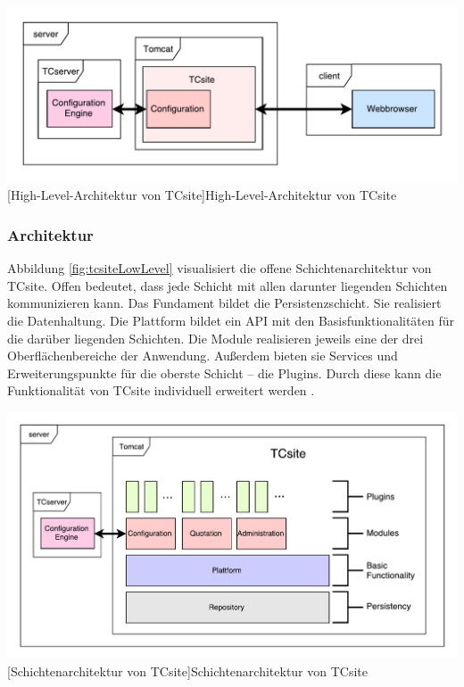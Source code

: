 \documentclass[11pt, a4paper, titlepage, listof=totoc, bibliography=totoc, index=totoc, twoside, openright, headings=normal, draft]{scrreprt}
\begin{document}
\vspace{1em}
\begin{minipage}{\linewidth}
	\centering
	\includegraphics[width=1\linewidth]{Abbildungen/tcsiteHighLevel.pdf}
	[High-Level-Architektur von TCsite]{High-Level-Architektur von TCsite}
	\label{fig:tcsiteHighLevel}
\end{minipage}
\vspace{0.3em}

\subsubsection{Architektur}
\label{TCsiteArchitektur}

Abbildung \ref{fig:tcsiteLowLevel} visualisiert die offene Schichtenarchitektur von TCsite. Offen bedeutet, dass jede Schicht mit allen darunter liegenden Schichten kommunizieren kann. Das Fundament bildet die Persistenzschicht. Sie realisiert die Datenhaltung. Die Plattform bildet ein \ac{API} mit den Basisfunktionalitäten für die darüber liegenden Schichten. Die Module realisieren jeweils eine der drei Oberflächenbereiche der Anwendung. Außerdem bieten sie Services und Erweiterungspunkte für die oberste Schicht -- die Plugins. Durch diese kann die Funktionalität von TCsite individuell erweitert werden \citep{tactonTCsiteDevelopmentManual}.

\vspace{1em}
\begin{minipage}{\linewidth}
	\centering
	\includegraphics[width=1\linewidth]{Abbildungen/tcsiteLowLevel.pdf}
	[Schichtenarchitektur von TCsite]{Schichtenarchitektur von TCsite}
	\label{fig:tcsiteLowLevel}
\end{minipage}
\vspace{0.3em}
\end{document}

